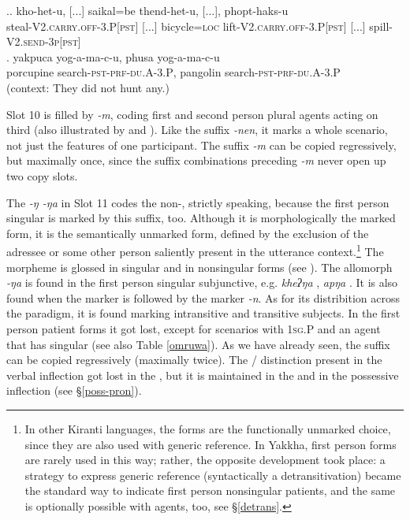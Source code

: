 \ex.\ag. kho-het-u, [...] saikal=be thend-het-u, [...],  phopt-haks-u      \\
steal{\scshape -V2.carry.off-3.P[pst]}  [...] bicycle{\scshape =loc} lift{\scshape -V2.carry.off-3.P[pst]} [...] spill{\scshape -V2.send-3p[pst]}\\
  
\bg. yakpuca   yog-a-ma-c-u, phusa    yog-a-ma-c-u\\
porcupine   search{\scshape -pst-prf-du.A-3.P}, pangolin   search{\scshape -pst-prf-du.A-3.P}\\
 (context: They did not hunt any.) 
	
	Slot  10 is filled by \emph{-m}, coding first and second person plural agents  acting on third (also illustrated by \LLast[a] and \LLast[c]). Like the suffix \emph{-nen}, it marks a whole scenario, not just the features of one participant. The suffix \emph{-m} can be copied regressively, but maximally once, since the suffix combinations preceding \emph{-m} never open up two copy slots.
	
	
The   \emph{-ŋ \ti -ŋa} in Slot 11 codes the non-,  strictly speaking, because the first person singular is marked by this suffix, too. Although it is morphologically the  marked form,  it is the semantically unmarked form, defined by the exclusion of the adressee or some other person saliently present in the utterance context.\footnote{In other Kiranti languages, the  forms are the functionally unmarked choice, since they are also used with generic reference. In Yakkha, first person forms are rarely used in this way; rather, the opposite development took place: a strategy to express generic reference (syntactically a detransitivation) became the standard way to indicate first person nonsingular patients, and the same is optionally possible with agents, too, see §\ref{detrans}.} The morpheme is glossed  in singular and   in nonsingular forms (see \Next). The allomorph \emph{-ŋa} is found in the first person singular subjunctive, e.g. \emph{kheʔŋa} , \emph{apŋa} . It is also found when the  marker is followed by the  marker \emph{-n}. As for its distribition across the paradigm, it is found marking intransitive and transitive subjects. In the first person patient forms it got lost, except for scenarios with {\scshape 1sg.P}  and an agent that has singular (see also Table \ref{omruwa}). As we have already seen, the  suffix can be copied regressively (maximally twice). The / distinction present in the verbal inflection got lost in the , but it is maintained in the  and in the possessive inflection (see §\ref{poss-pron}). 

